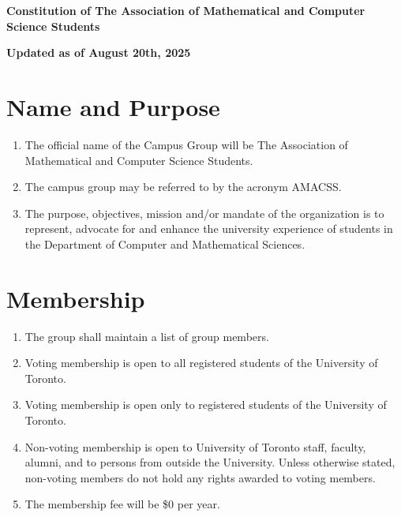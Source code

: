 \documentclass[12pt,a4paper]{article}
\begin{document}
\begin{center}
{\Large\textbf{Constitution of The Association of Mathematical and Computer Science Students}}

\vspace{0.5cm}
{\large\textbf{Updated as of August 20th, 2025}}
\end{center}

\vspace{1cm}

\section{Name and Purpose}

\begin{enumerate}
\item The official name of the Campus Group will be The Association of Mathematical and Computer Science Students.

\item The campus group may be referred to by the acronym AMACSS.

\item The purpose, objectives, mission and/or mandate of the organization is to represent, advocate for and enhance the university experience of students in the Department of Computer and Mathematical Sciences.
\end{enumerate}

\section{Membership}

\begin{enumerate}
\item The group shall maintain a list of group members.

\item Voting membership is open to all registered students of the University of Toronto.

\item Voting membership is open only to registered students of the University of Toronto.

\item Non-voting membership is open to University of Toronto staff, faculty, alumni, and to persons from outside the University. Unless otherwise stated, non-voting members do not hold any rights awarded to voting members.

\item The membership fee will be \$0 per year.
\end{enumerate}
\end{document}
